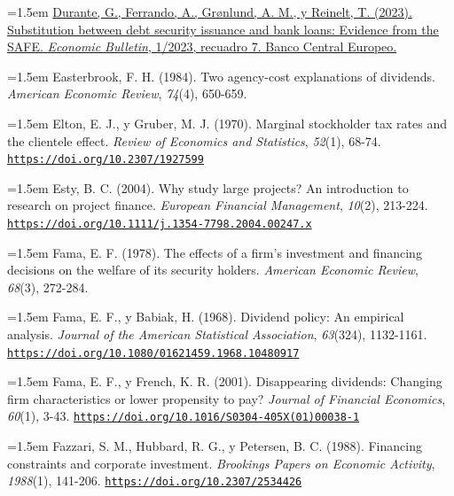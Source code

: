 \documentclass[10pt,a4paper]{article}
\begin{document}
\noindent\hangindent=1.5em \href{https://www.ecb.europa.eu/press/economic-bulletin/focus/2023/html/ecb.ebbox202301_07~78a838eb48.en.html}{Durante, G., Ferrando, A., Grønlund, A. M., y Reinelt, T. (2023). Substitution between debt security issuance and bank loans: Evidence from the SAFE. \textit{Economic Bulletin}, 1/2023, recuadro 7. Banco Central Europeo.}

\noindent\hangindent=1.5em Easterbrook, F. H. (1984). Two agency-cost explanations of dividends. \textit{American Economic Review}, \textit{74}(4), 650-659.

\noindent\hangindent=1.5em Elton, E. J., y Gruber, M. J. (1970). Marginal stockholder tax rates and the clientele effect. \textit{Review of Economics and Statistics}, \textit{52}(1), 68-74. \href{https://doi.org/10.2307/1927599}{\nolinkurl{https://doi.org/10.2307/1927599}}

\noindent\hangindent=1.5em Esty, B. C. (2004). Why study large projects? An introduction to research on project finance. \textit{European Financial Management}, \textit{10}(2), 213-224. \href{https://doi.org/10.1111/j.1354-7798.2004.00247.x}{\nolinkurl{https://doi.org/10.1111/j.1354-7798.2004.00247.x}}

\noindent\hangindent=1.5em Fama, E. F. (1978). The effects of a firm's investment and financing decisions on the welfare of its security holders. \textit{American Economic Review}, \textit{68}(3), 272-284.

\noindent\hangindent=1.5em Fama, E. F., y Babiak, H. (1968). Dividend policy: An empirical analysis. \textit{Journal of the American Statistical Association}, \textit{63}(324), 1132-1161. \href{https://doi.org/10.1080/01621459.1968.10480917}{\nolinkurl{https://doi.org/10.1080/01621459.1968.10480917}}

\noindent\hangindent=1.5em Fama, E. F., y French, K. R. (2001). Disappearing dividends: Changing firm characteristics or lower propensity to pay? \textit{Journal of Financial Economics}, \textit{60}(1), 3-43. \href{https://doi.org/10.1016/S0304-405X(01)00038-1}{\nolinkurl{https://doi.org/10.1016/S0304-405X(01)00038-1}}

\noindent\hangindent=1.5em Fazzari, S. M., Hubbard, R. G., y Petersen, B. C. (1988). Financing constraints and corporate investment. \textit{Brookings Papers on Economic Activity}, \textit{1988}(1), 141-206. \href{https://doi.org/10.2307/2534426}{\nolinkurl{https://doi.org/10.2307/2534426}}
\end{document}
